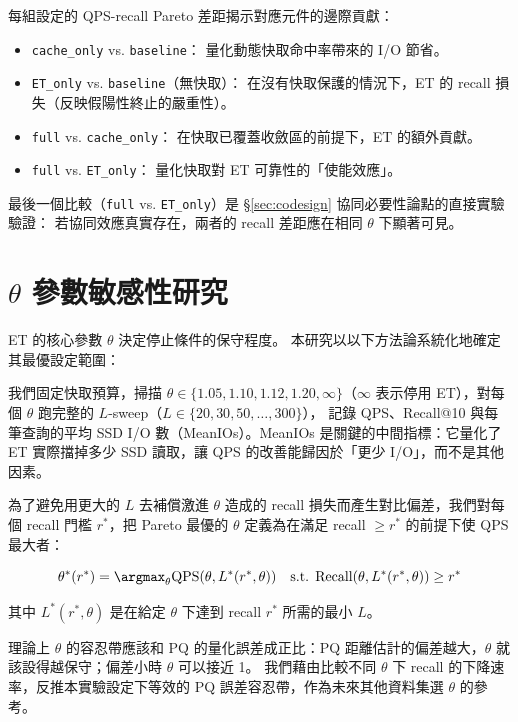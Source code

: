 每組設定的 QPS-recall Pareto 差距揭示對應元件的邊際貢獻：
\begin{itemize}
  \item \texttt{cache\_only} vs. \texttt{baseline}：
    量化動態快取命中率帶來的 I/O 節省。
  \item \texttt{ET\_only} vs. \texttt{baseline}（無快取）：
    在沒有快取保護的情況下，ET 的 recall 損失（反映假陽性終止的嚴重性）。
  \item \texttt{full} vs. \texttt{cache\_only}：
    在快取已覆蓋收斂區的前提下，ET 的額外貢獻。
  \item \texttt{full} vs. \texttt{ET\_only}：
    量化快取對 ET 可靠性的「使能效應」。
\end{itemize}

最後一個比較（\texttt{full} vs. \texttt{ET\_only}）是
§\ref{sec:codesign} 協同必要性論點的直接實驗驗證：
若協同效應真實存在，兩者的 recall 差距應在相同 $\theta$ 下顯著可見。

\section{$\theta$ 參數敏感性研究}
\label{sec:theta-sweep}

ET 的核心參數 $\theta$ 決定停止條件的保守程度。
本研究以以下方法論系統化地確定其最優設定範圍：

我們固定快取預算，掃描 $\theta \in \{1.05, 1.10, 1.12, 1.20, \infty\}$（$\infty$ 表示停用 ET），對每個 $\theta$ 跑完整的 $L$-sweep（$L \in \{20, 30, 50, \ldots, 300\}$），
記錄 QPS、Recall@10 與每筆查詢的平均 SSD I/O 數（MeanIOs）。MeanIOs 是關鍵的中間指標：它量化了 ET 實際擋掉多少 SSD 讀取，讓 QPS 的改善能歸因於「更少 I/O」，而不是其他因素。

為了避免用更大的 $L$ 去補償激進 $\theta$ 造成的 recall 損失而產生對比偏差，我們對每個 recall 門檻 $r^*$，把 Pareto 最優的 $\theta$ 定義為在滿足 recall $\ge r^*$ 的前提下使 QPS 最大者：

\begin{equation}
  \theta^*(r^*) = \argmax_{\theta} \text{QPS}(\theta, L^*(r^*,\theta))
  \quad \text{s.t. } \text{Recall}(\theta, L^*(r^*,\theta)) \geq r^*
  \label{eq:theta-opt}
\end{equation}

其中 $L^*(r^*, \theta)$ 是在給定 $\theta$ 下達到 recall $r^*$ 所需的最小 $L$。

理論上 $\theta$ 的容忍帶應該和 PQ 的量化誤差成正比：PQ 距離估計的偏差越大，$\theta$ 就該設得越保守；偏差小時 $\theta$ 可以接近 1。
我們藉由比較不同 $\theta$ 下 recall 的下降速率，反推本實驗設定下等效的 PQ 誤差容忍帶，作為未來其他資料集選 $\theta$ 的參考。

